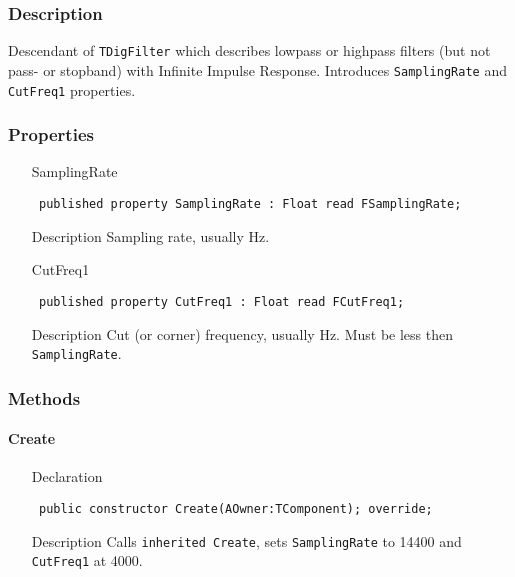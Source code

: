 \documentclass[12pt,a4paper,oneside]{report}
\newcommand{\declarationitem}[1]{{\addfontfeatures{FakeBold=1.3} #1}}
\newcommand{\descriptiontitle}[1]{{\addfontfeatures{FakeSlant}#1}}
\newcommand{\code}[1]{\texttt{#1}}
\begin{document}
\subsubsection{Description}
Descendant of \code{TDigFilter} which describes lowpass or highpass filters (but not pass- or stopband) with Infinite Impulse Response. Introduces \code{SamplingRate} and \code{CutFreq1} properties.
\subsubsection{Properties}
\begin{itemize}\label{lmfilters.TOneFreqFilter-SamplingRate}
	\item[\declarationitem{SamplingRate}\hfill]
	\begin{flushleft}
		\code{
			published property SamplingRate : Float read FSamplingRate;}
	\end{flushleft}
	\item[\descriptiontitle{Description}]
	Sampling rate, usually Hz.
	\label{lmfilters.TOneFreqFilter-Cutfreq1}
	\item[\declarationitem{CutFreq1}\hfill]
	\begin{flushleft}
		\code{
			published property CutFreq1     : Float read FCutFreq1;}
	\end{flushleft}
	\item[\descriptiontitle{Description}] Cut (or corner) frequency, usually Hz. Must be less then \code{SamplingRate}.
	\end{itemize}
\subsubsection{Methods}
\paragraph{Create}\hspace*{\fill}
\label{lmfilters.TOneFreqFilter-Create}
\begin{itemize}\item[\declarationitem{Declaration}\hfill]
	\begin{flushleft}
		\code{
			public constructor Create(AOwner:TComponent); override;}
	\end{flushleft}
\item[\descriptiontitle{Description}] Calls \code{inherited Create}, sets \code{SamplingRate} to 14400 and \code{CutFreq1} at 4000.
\end{itemize}
\end{document}
